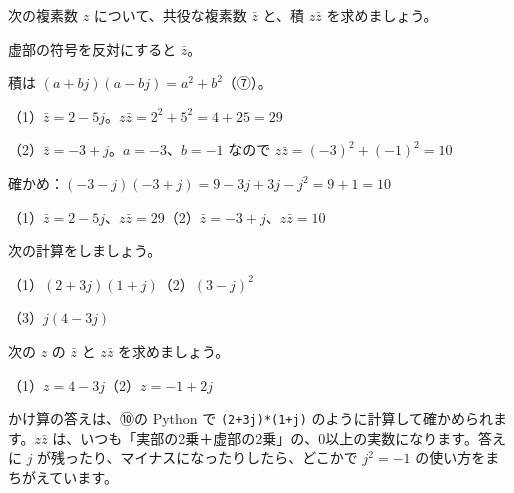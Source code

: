 \begin{reidai}[共役な複素数をかける]
次の複素数 $z$ について、共役な複素数 $\bar z$ と、積 $z\bar z$ を求めましょう。\newline{}\par
\kangaekata 虚部の符号を反対にすると $\bar z$。\par
積は $(a+bj)(a-bj)=a^2+b^2$（⑦）。\par
\shiki{}\zw{} （1）$\bar z=2-5j$。$z\bar z=2^2+5^2=4+25=29$\par
\bkviiq （2）$\bar z=-3+j$。$a=-3$、$b=-1$ なので $z\bar z=(-3)^2+(-1)^2=10$\par
\bkviib 確かめ：$(-3-j)(-3+j)=9-3j+3j-j^2=9+1=10$\par
\kotae{}\zw{} （1）$\bar z=2-5j$、$z\bar z=29$\quad（2）$\bar z=-3+j$、$z\bar z=10$
\end{reidai}

\noindent\begin{minipage}[t]{0.485\linewidth}\vspace{0pt}
\begin{jibun}
次の計算をしましょう。\par
（1）$(2+3j)(1+j)$\newline（2）$(3-j)^2$\par
（3）$j(4-3j)$
\end{jibun}
\end{minipage}\hfill
\begin{minipage}[t]{0.485\linewidth}\vspace{0pt}
\begin{jibun}
次の $z$ の $\bar z$ と $z\bar z$ を求めましょう。\par
（1）$z=4-3j$\newline（2）$z=-1+2j$
\end{jibun}
\end{minipage}

\noindent かけ算の答えは、⑩の Python で \texttt{(2+3j)*(1+j)} のように計算して確かめられます。$z\bar z$ は、いつも「実部の2乗＋虚部の2乗」の、0以上の実数になります。答えに $j$ が残ったり、マイナスになったりしたら、どこかで $j^2=-1$ の使い方をまちがえています。

